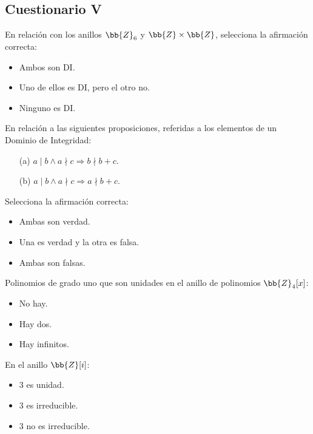 \subsection{Cuestionario V}

\begin{ejercicio}
    En relación con los anillos $\bb{Z}_6$ y $\bb{Z} \times \bb{Z}$, selecciona la afirmación correcta:
    \begin{itemize}
        \item Ambos son DI.
        \item Uno de ellos es DI, pero el otro no.
        \item Ninguno es DI.
    \end{itemize}
\end{ejercicio}

\begin{ejercicio}
    En relación a las siguientes proposiciones, referidas a los elementos de un Dominio de Integridad:
    \begin{enumerate}
        \item [(a)] $a\mid b \land a \nmid c \Rightarrow b \nmid b+c$.
        \item [(b)] $a\mid b \land a \nmid c \Rightarrow a \nmid b+c$.
    \end{enumerate}
    Selecciona la afirmación correcta:
    \begin{itemize}
        \item Ambas son verdad.
        \item Una es verdad y la otra es falsa.
        \item Ambas son falsas.
    \end{itemize}
\end{ejercicio}

\begin{ejercicio}
    Polinomios de grado uno que son unidades en el anillo de polinomios $\bb{Z}_4[x]$:
    \begin{itemize}
        \item No hay.
        \item Hay dos.
        \item Hay infinitos.
    \end{itemize}
\end{ejercicio}

\begin{ejercicio}
    En el anillo $\bb{Z}[i]$:
    \begin{itemize}
        \item $3$ es unidad.
        \item $3$ es irreducible.
        \item $3$ no es irreducible.
    \end{itemize}
\end{ejercicio}

